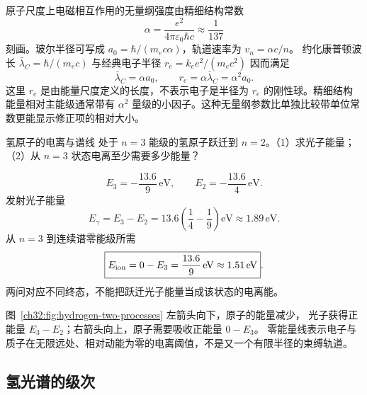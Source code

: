 原子尺度上电磁相互作用的无量纲强度由精细结构常数
\begin{equation}
 \alpha=\frac{e^2}{4\pi\varepsilon_0\hbar c}\approx\frac1{137}
\end{equation}
刻画。玻尔半径可写成 $a_0=\hbar/(m_ec\alpha)$，轨道速率为 $v_n=\alpha c/n$。
约化康普顿波长 $\bar\lambda_C=\hbar/(m_ec)$ 与经典电子半径 $r_e=k_ee^2/(m_ec^2)$ 因而满足
\[
 \bar\lambda_C=\alpha a_0,\qquad r_e=\alpha\bar\lambda_C=\alpha^2a_0.
\]
这里 $r_e$ 是由能量尺度定义的长度，不表示电子是半径为 $r_e$ 的刚性球。精细结构能量相对主能级通常带有 $\alpha^2$ 量级的小因子。这种无量纲参数比单独比较带单位常数更能显示修正项的相对大小。

\begin{origexamplebox}{氢原子的电离与谱线}
处于 $n=3$ 能级的氢原子跃迁到 $n=2$。（1）求光子能量；（2）从 $n=3$ 状态电离至少需要多少能量？
\end{origexamplebox}
\begin{xesolution}
\[
 E_3=-\frac{13.6}{9}\,\mathrm{eV},\qquad E_2=-\frac{13.6}{4}\,\mathrm{eV}.
\]
发射光子能量
\[
 \boxed{E_\gamma=E_3-E_2=13.6\left(\frac14-\frac19\right)\mathrm{eV}
 \approx1.89\,\mathrm{eV}}.
\]
从 $n=3$ 到连续谱零能级所需
\[
 \boxed{E_{\rm ion}=0-E_3=\frac{13.6}{9}\,\mathrm{eV}\approx1.51\,\mathrm{eV}}.
\]
两问对应不同终态，不能把跃迁光子能量当成该状态的电离能。
\begin{center}

\label{ch32:fig:hydrogen-two-processes}
\end{center}
图~\ref{ch32:fig:hydrogen-two-processes} 左箭头向下，原子的能量减少，
光子获得正能量 $E_3-E_2$；右箭头向上，原子需要吸收正能量 $0-E_3$。
零能量线表示电子与质子在无限远处、相对动能为零的电离阈值，不是又一个有限半径的束缚轨道。
\end{xesolution}



\subsection{氢光谱的级次}


